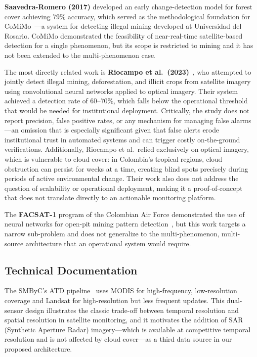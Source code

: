 \documentclass{article}
\begin{document}
\textbf{Saavedra-Romero (2017)} developed an early change-detection model for
forest cover achieving 79\% accuracy, which served as the methodological
foundation for CoMiMo~\cite{comimo_urosario}---a system for detecting illegal
mining developed at Universidad del Rosario.
CoMiMo demonstrated the feasibility of near-real-time satellite-based detection
for a single phenomenon, but its scope is restricted to mining and it has not
been extended to the multi-phenomenon case.

The most directly related work is \textbf{Riocampo et al.\ (2023)}~\cite{riocampo2023},
who attempted to jointly detect illegal mining, deforestation, and illicit crops
from satellite imagery using convolutional neural networks applied to optical
imagery.
Their system achieved a detection rate of 60--70\%, which falls below the
operational threshold that would be needed for institutional deployment.
Critically, the study does not report precision, false positive rates, or
any mechanism for managing false alarms---an omission that is especially
significant given that false alerts erode institutional trust in automated
systems and can trigger costly on-the-ground verifications.
Additionally, Riocampo et al.\ relied exclusively on optical imagery, which is
vulnerable to cloud cover: in Colombia's tropical regions, cloud obstruction
can persist for weeks at a time, creating blind spots precisely during
periods of active environmental change.
Their work also does not address the question of scalability or operational
deployment, making it a proof-of-concept that does not translate directly
to an actionable monitoring platform.

The \textbf{FACSAT-1} program of the Colombian Air Force demonstrated the use
of neural networks for open-pit mining pattern detection~\cite{facsat1}, but
this work targets a narrow sub-problem and does not generalize to the
multi-phenomenon, multi-source architecture that an operational system
would require.

\subsection{Technical Documentation}

The SMByC's ATD pipeline~\cite{smbyc_atd_github} uses MODIS for high-frequency,
low-resolution coverage and Landsat for high-resolution but less frequent updates.
This dual-sensor design illustrates the classic trade-off between temporal
resolution and spatial resolution in satellite monitoring, and it motivates the
addition of SAR (Synthetic Aperture Radar) imagery---which is available at
competitive temporal resolution and is not affected by cloud cover---as a third
data source in our proposed architecture.
\end{document}
